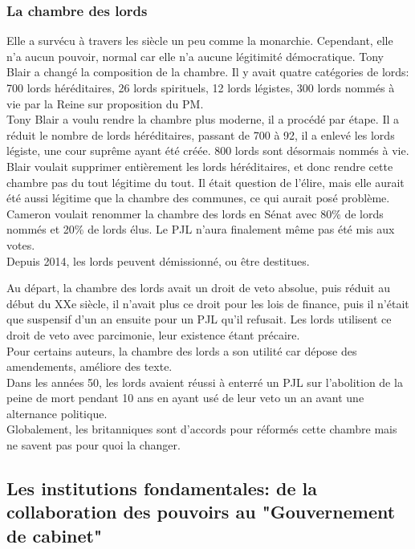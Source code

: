 \documentclass[10pt, a4paper, openany]{book}
\begin{document}
\subsubsection{La chambre des lords}

Elle a survécu à travers les siècle un peu comme la monarchie. Cependant, elle n'a aucun pouvoir, normal car elle n'a aucune légitimité démocratique. Tony Blair a changé la composition de la chambre. Il y avait quatre catégories de lords: 700 lords héréditaires, 26 lords spirituels, 12 lords légistes, 300 lords nommés à vie par la Reine sur proposition du PM. \\
Tony Blair a voulu rendre la chambre plus moderne, il a procédé par étape. Il a réduit le nombre de lords héréditaires, passant de 700 à 92, il a enlevé les lords légiste, une cour suprême ayant été créée. 800 lords sont désormais nommés à vie. \\
Blair voulait supprimer entièrement les lords héréditaires, et donc rendre cette chambre pas du tout légitime du tout. Il était question de l'élire, mais elle aurait été aussi légitime que la chambre des communes, ce qui aurait posé problème. Cameron voulait renommer la chambre des lords en Sénat avec 80\% de lords nommés et 20\% de lords élus. Le PJL n'aura finalement même pas été mis aux votes. \\
Depuis 2014, les lords peuvent démissionné, ou être destitues. 


Au départ, la chambre des lords avait un droit de veto absolue, puis réduit au début du XXe siècle, il n'avait plus ce droit pour les lois de finance, puis il n'était que suspensif d'un an ensuite pour un PJL qu'il refusait. Les lords utilisent ce droit de veto avec parcimonie, leur existence étant précaire. \\
Pour certains auteurs, la chambre des lords a son utilité car dépose des amendements, améliore des texte. \\
Dans les années 50, les lords avaient réussi à enterré un PJL sur l'abolition de la peine de mort pendant 10 ans en ayant usé de leur veto un an avant une alternance politique. \\
Globalement, les britanniques sont d'accords pour réformés cette chambre mais ne savent pas pour quoi la changer. 

\subsection{Les institutions fondamentales: de la collaboration des pouvoirs au "Gouvernement de cabinet"}
\end{document}

